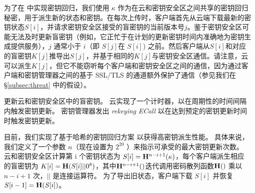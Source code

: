 为了在 \sysnameS 中实现密钥回归，我们使用 $\kappa$ 作为在云和密钥安全区之间共享的密钥回归秘密，用于派生新的状态和密钥。在每次上传时，客户端首先从云端下载最新的密钥状态$S[i]$，并请求密钥安全区接受的盲密钥的当前版本号$j$。鉴于密钥安全区可能无法及时更新盲密钥（例如，它正忙于在计划的更新密钥时间内准确地为密钥生成提供服务），$j$ 通常小于 $i$（即 $S[j]$在 $S[i]$) 之前。然后客户端从$S[i]$和对应的盲密钥$K[j]$推导出$S[j]$，并基于相同的$K[j]$与密钥安全区通信。请注意，云可以派生$K[j]$，但它不能窃听每个客户端和密钥安全区之间的通信，因为通过客户端和密钥管理器之间的基于 SSL/TLS 的通道额外保护了通信（参见我们在 \S\ref{subsec:threat} 中的假设）。

\sysnameS 更新云和密钥安全区中的盲密钥。 云实现了一个计时器，以在周期性的时间间隔内触发密钥更新。 密钥管理器发出 \textit{ rekeying ECall} 以在达到预定的密钥更新时间时触发密钥更新。

目前，我们实现了基于哈希的密钥回归方案 \cite{fu06} 以获得高密钥派生性能。 具体来说，我们定义了一个参数 $n$（现在设置为 $2^{20}$ \cite{fu06}）来指示可承受的最大密钥更新次数。 云和密钥安全区计算第 i 个密钥状态为 $S[i] = {\bf H}^{n-i+1}(\kappa)$，每个客户端派生相应的盲密钥为 $K[i] = {\bf H}(S[i] || 0^8)$，其中${\bf H}^{n-i+1}()$迭代调用密码散列函数${ \bf H}()$ 乘以 $n-i+1$ 次，$||$ 是连接运算符。 为了导出旧状态，客户端下载 $S[i]$ 并恢复 $S[i-1] = {\bf H}(S[i])$。
